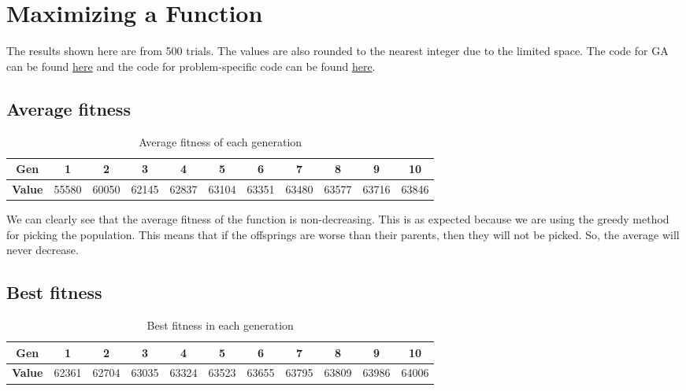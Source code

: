 \section{Maximizing a Function}

The results shown here are from 500 trials. The values are also rounded to the nearest integer due to the limited space. The code for GA can be found \href{https://github.com/nngerncham/ma395_heuristic/blob/main/homework/hw4/code/src/main/scala/GARouletteWheel.scala}{here} and the code for problem-specific code can be found \href{https://github.com/nngerncham/ma395_heuristic/blob/main/homework/hw4/code/src/main/scala/Problem2.scala}{here}.

\subsection{Average fitness}

\begin{table}[ht]
    \centering
    \begin{tabular}{ccccccccccc}
        \toprule
        \textbf{Gen} & 1 & 2 & 3 & 4 & 5 & 6 & 7 & 8 & 9 & 10 \\
        \midrule
        \textbf{Value} & 55580 & 60050 & 62145 & 62837 & 63104 & 63351 & 63480 & 63577 & 63716 & 63846 \\
        \bottomrule
    \end{tabular}
    \caption{Average fitness of each generation}
\end{table}

We can clearly see that the average fitness of the function is non-decreasing. This is as expected because we are using the greedy method for picking the population. This means that if the offsprings are worse than their parents, then they will not be picked. So, the average will never decrease.

\subsection{Best fitness}

\begin{table}[ht]
    \centering
    \begin{tabular}{ccccccccccc}
        \toprule
        \textbf{Gen} & 1 & 2 & 3 & 4 & 5 & 6 & 7 & 8 & 9 & 10 \\
        \midrule
        \textbf{Value} & 62361 & 62704 & 63035 & 63324 & 63523 & 63655 & 63795 & 63809 & 63986 & 64006 \\
        \bottomrule
    \end{tabular}
    \caption{Best fitness in each generation}
\end{table}

